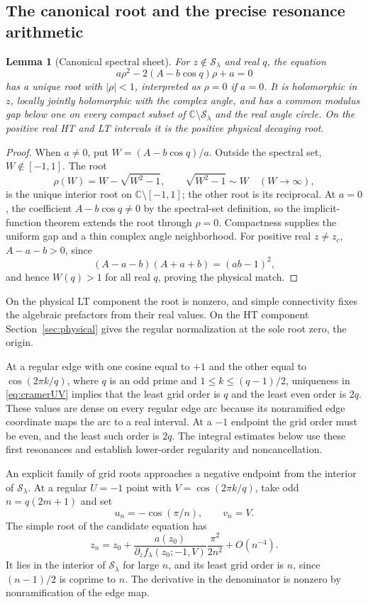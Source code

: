 \documentclass[11pt]{article}
\numberwithin{equation}{section}
\newtheorem{lemma}[theorem]{Lemma}
\theoremstyle{definition}
\newcommand{\C}{\mathbb C}
\newcommand{\cS}{\mathcal S}
\begin{document}
\subsection{The canonical root and the precise resonance arithmetic}

\begin{lemma}[Canonical spectral sheet]\label{lem:canonicalroot}
For \(z\notin\cS_\lambda\) and real \(q\), the equation
\[
 a\rho^2-2(A-b\cos q)\rho+a=0
\]
has a unique root with \(|\rho|<1\), interpreted as \(\rho=0\) if
\(a=0\). It is holomorphic in \(z\), locally jointly holomorphic
with the complex angle, and has a common modulus gap below one on
every compact subset of \(\C\setminus\cS_\lambda\) and the real
angle circle. On the positive real HT and LT intervals it is the
positive physical decaying root.
\end{lemma}
\begin{proof}
When \(a\ne0\), put \(W=(A-b\cos q)/a\). Outside the spectral set,
\(W\notin[-1,1]\). The root
\[
 \rho(W)=W-\sqrt{W^2-1},\qquad \sqrt{W^2-1}\sim W\quad(W\to\infty),
\]
is the unique interior root on \(\C\setminus[-1,1]\); the other root
is its reciprocal. At \(a=0\), the coefficient \(A-b\cos q\ne0\)
by the spectral-set definition, so the implicit-function theorem
extends the root through \(\rho=0\). Compactness supplies the uniform
gap and a thin complex angle neighborhood. For positive real
\(z\ne z_c\), \(A-a-b>0\), since
\[
 (A-a-b)(A+a+b)=(ab-1)^2,
\]
and hence \(W(q)>1\) for all real \(q\), proving the physical match.
\end{proof}

On the physical LT component the root is nonzero, and simple
connectivity fixes the algebraic prefactors from their real values.
On the HT component Section~\ref{sec:physical} gives the regular
normalization at the sole root zero, the origin.

At a regular edge with one cosine equal to \(+1\) and the other
equal to \(\cos(2\pi k/q)\), where \(q\) is an odd prime and
\(1\le k\le(q-1)/2\), uniqueness in \eqref{eq:cramerUV} implies that
the least grid order is \(q\) and the least even order is \(2q\).
These values are dense on every regular edge arc because its
nonramified edge coordinate maps the arc to a real interval. At a
\(-1\) endpoint the grid order must be even, and the least such order
is \(2q\). The integral estimates below use these first resonances
and establish lower-order regularity and noncancellation.

An explicit family of grid roots approaches a negative endpoint
from the interior of \(\cS_\lambda\).
At a regular \(U=-1\) point with
\(V=\cos(2\pi k/q)\), take odd \(n=q(2m+1)\) and set
\[
 u_n=-\cos(\pi/n),\qquad v_n=V.
\]
The simple root of the candidate equation has
\[
 z_n=z_0+\frac{a(z_0)}{\partial_z f_\lambda(z_0;-1,V)}
                  \frac{\pi^2}{2n^2}+O(n^{-4}).
\]
It lies in the interior of \(\cS_\lambda\) for large \(n\), and its
least grid order is \(n\), since \((n-1)/2\) is coprime to \(n\).
The derivative in the denominator is nonzero by nonramification of
the edge map.
\end{document}
